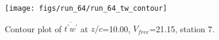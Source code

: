 \begin{figure}[H]
\centering
\texttt{[image: figs/run\_64/run\_64\_tw\_contour]}
\caption{Contour plot of $\overline{t^\prime w^\prime}$ at $z/c$=10.00, $V_{free}$=21.15, station 7.}
\label{fig:run_64_tw_contour}
\end{figure}


